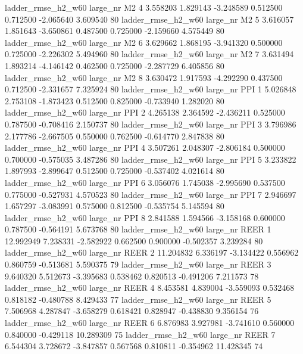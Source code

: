  ladder_rmse_h2_w60   large_nr       M2                 4  3.558203  1.829143  -3.248589 0.512500 0.712500 -2.065640    3.609540 80
 ladder_rmse_h2_w60   large_nr       M2                 5  3.616057  1.851643  -3.650861 0.487500 0.725000 -2.159660    4.575449 80
 ladder_rmse_h2_w60   large_nr       M2                 6  3.629662  1.868195  -3.941320 0.500000 0.725000 -2.226302    5.494960 80
 ladder_rmse_h2_w60   large_nr       M2                 7  3.631494  1.893214  -4.146142 0.462500 0.725000 -2.287729    6.405856 80
 ladder_rmse_h2_w60   large_nr       M2                 8  3.630472  1.917593  -4.292290 0.437500 0.712500 -2.331657    7.325924 80
 ladder_rmse_h2_w60   large_nr      PPI                 1  5.026848  2.753108  -1.873423 0.512500 0.825000 -0.733940    1.282020 80
 ladder_rmse_h2_w60   large_nr      PPI                 2  4.265138  2.364592  -2.436211 0.525000 0.787500 -0.708416    2.150737 80
 ladder_rmse_h2_w60   large_nr      PPI                 3  3.796986  2.177786  -2.667505 0.550000 0.762500 -0.614770    2.847838 80
 ladder_rmse_h2_w60   large_nr      PPI                 4  3.507261  2.048307  -2.806184 0.500000 0.700000 -0.575035    3.487286 80
 ladder_rmse_h2_w60   large_nr      PPI                 5  3.233822  1.897993  -2.899647 0.512500 0.725000 -0.537402    4.021614 80
 ladder_rmse_h2_w60   large_nr      PPI                 6  3.056076  1.745038  -2.995690 0.537500 0.775000 -0.527931    4.570523 80
 ladder_rmse_h2_w60   large_nr      PPI                 7  2.946697  1.657297  -3.083991 0.575000 0.812500 -0.535754    5.145594 80
 ladder_rmse_h2_w60   large_nr      PPI                 8  2.841588  1.594566  -3.158168 0.600000 0.787500 -0.564191    5.673768 80
 ladder_rmse_h2_w60   large_nr     REER                 1 12.992949  7.238331  -2.582922 0.662500 0.900000 -0.502357    3.239284 80
 ladder_rmse_h2_w60   large_nr     REER                 2 11.204832  6.336197  -3.134422 0.556962 0.860759 -0.513681    5.590375 79
 ladder_rmse_h2_w60   large_nr     REER                 3  9.640320  5.512673  -3.395683 0.538462 0.820513 -0.491206    7.211573 78
 ladder_rmse_h2_w60   large_nr     REER                 4  8.453581  4.839004  -3.559093 0.532468 0.818182 -0.480788    8.429433 77
 ladder_rmse_h2_w60   large_nr     REER                 5  7.506968  4.287847  -3.658279 0.618421 0.828947 -0.438830    9.356154 76
 ladder_rmse_h2_w60   large_nr     REER                 6  6.876983  3.927981  -3.741610 0.560000 0.840000 -0.429118   10.289309 75
 ladder_rmse_h2_w60   large_nr     REER                 7  6.544304  3.728672  -3.847857 0.567568 0.810811 -0.354962   11.428345 74
